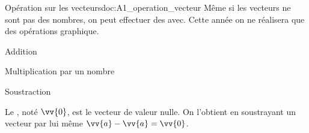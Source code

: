 \begin{doc}{Opération sur les vecteurs}{doc:A1_operation_vecteur}
  Même si les vecteurs ne sont pas des nombres, on peut effectuer des  avec.
  Cette année on ne réalisera que des opérations graphique.
  \begin{multicols}{3}
    \centering
    \begin{boite}
      \vAligne{50pt}
    \end{boite}
    Addition
    
    \begin{boite}
      \vAligne{50pt}
    \end{boite}
    Multiplication par un nombre

    \begin{boite}
      \vAligne{50pt}
    \end{boite}
    Soustraction
  \end{multicols}

  \begin{importants}
    Le , noté $\vv{0}$, est le vecteur de valeur nulle.
    On l'obtient en soustrayant un vecteur par lui même $\vv{a} - \vv{a} = \vv{0}$.
  \end{importants}
\end{doc}